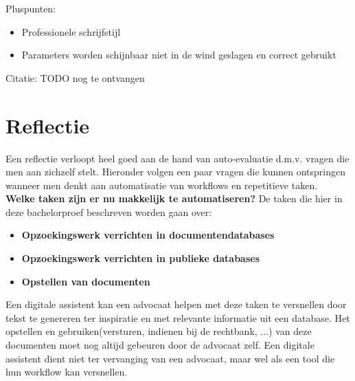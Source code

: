 Pluspunten:
\begin{itemize}
	\item Professionele schrijfstijl
	\item Parameters worden schijnbaar niet in de wind geslagen en correct gebruikt
\end{itemize}


Citatie: TODO nog te ontvangen 



\section{Reflectie}
Een reflectie verloopt heel goed aan de hand van auto-evaluatie d.m.v. vragen die men aan zichzelf stelt. 
Hieronder volgen een paar vragen die kunnen ontspringen wanneer men denkt aan automatisatie van workflows en repetitieve taken.\\ 

\textbf{Welke taken zijn er nu makkelijk te automatiseren?}
De taken die hier in deze bachelorproef beschreven worden gaan over:
\begin{itemize}
	\item \textbf{Opzoekingswerk verrichten in documentendatabases}
	\item \textbf{Opzoekingswerk verrichten in publieke databases}
	\item \textbf{Opstellen van documenten}
\end{itemize}
Een digitale assistent kan een advocaat helpen met deze taken te versnellen door tekst te genereren ter inspiratie en met relevante informatie uit een database. 
Het opstellen en gebruiken(versturen, indienen bij de rechtbank, ...) van deze documenten moet nog altijd gebeuren door de advocaat zelf. 
Een digitale assistent dient niet ter vervanging van een advocaat, maar wel als een tool die hun workflow kan versnellen. \\ 

